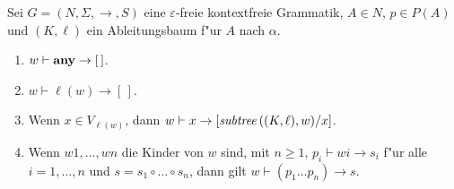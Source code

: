 \documentclass[12pt,a4paper]{article}
\begin{document}
\begin{definition}[Patternmatching]
  Sei $G = (N,\Sigma,\to,S)$ eine $\varepsilon$-freie kontextfreie Grammatik,
  $A \in N$, $p \in P(A)$ und $(K,\ell)$ ein
  Ableitungsbaum f"ur $A$ nach $\alpha$. 
  \begin{enumerate}
  \item $w \vdash \mathbf{any} \to [\,]$.
  \item $w \vdash \ell(w) \to [\,]$.
  \item Wenn $x \in V_{\ell(w)}$, dann $w \vdash x \to [\mathit{subtree}\,((K,\ell),w)/x]$.
  \item Wenn $w1,\ldots,wn$ die Kinder von $w$ sind, mit $n \ge 1$, $p_i \vdash wi \to s_i$ f"ur alle
    $i=1,\ldots,n$ und $s = s_1 \circ \ldots \circ s_n$, dann gilt $w \vdash (p_1 \ldots p_n) \to s$.
  \end{enumerate}
\end{definition}
\end{document}
